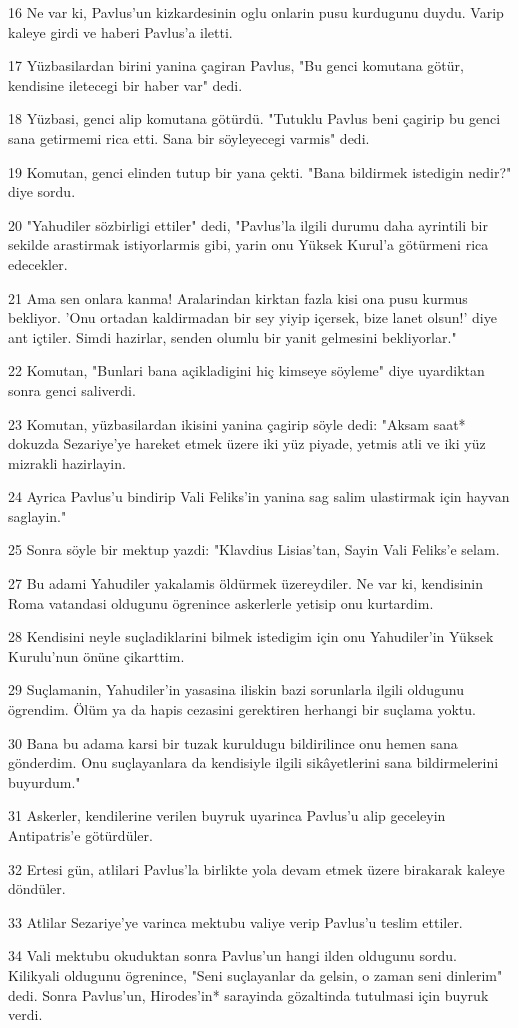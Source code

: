 \par 16 Ne var ki, Pavlus'un kizkardesinin oglu onlarin pusu kurdugunu duydu. Varip kaleye girdi ve haberi Pavlus'a iletti.
\par 17 Yüzbasilardan birini yanina çagiran Pavlus, "Bu genci komutana götür, kendisine iletecegi bir haber var" dedi.
\par 18 Yüzbasi, genci alip komutana götürdü. "Tutuklu Pavlus beni çagirip bu genci sana getirmemi rica etti. Sana bir söyleyecegi varmis" dedi.
\par 19 Komutan, genci elinden tutup bir yana çekti. "Bana bildirmek istedigin nedir?" diye sordu.
\par 20 "Yahudiler sözbirligi ettiler" dedi, "Pavlus'la ilgili durumu daha ayrintili bir sekilde arastirmak istiyorlarmis gibi, yarin onu Yüksek Kurul'a götürmeni rica edecekler.
\par 21 Ama sen onlara kanma! Aralarindan kirktan fazla kisi ona pusu kurmus bekliyor. 'Onu ortadan kaldirmadan bir sey yiyip içersek, bize lanet olsun!' diye ant içtiler. Simdi hazirlar, senden olumlu bir yanit gelmesini bekliyorlar."
\par 22 Komutan, "Bunlari bana açikladigini hiç kimseye söyleme" diye uyardiktan sonra genci saliverdi.
\par 23 Komutan, yüzbasilardan ikisini yanina çagirip söyle dedi: "Aksam saat* dokuzda Sezariye'ye hareket etmek üzere iki yüz piyade, yetmis atli ve iki yüz mizrakli hazirlayin.
\par 24 Ayrica Pavlus'u bindirip Vali Feliks'in yanina sag salim ulastirmak için hayvan saglayin."
\par 25 Sonra söyle bir mektup yazdi: "Klavdius Lisias'tan, Sayin Vali Feliks'e selam.
\par 27 Bu adami Yahudiler yakalamis öldürmek üzereydiler. Ne var ki, kendisinin Roma vatandasi oldugunu ögrenince askerlerle yetisip onu kurtardim.
\par 28 Kendisini neyle suçladiklarini bilmek istedigim için onu Yahudiler'in Yüksek Kurulu'nun önüne çikarttim.
\par 29 Suçlamanin, Yahudiler'in yasasina iliskin bazi sorunlarla ilgili oldugunu ögrendim. Ölüm ya da hapis cezasini gerektiren herhangi bir suçlama yoktu.
\par 30 Bana bu adama karsi bir tuzak kuruldugu bildirilince onu hemen sana gönderdim. Onu suçlayanlara da kendisiyle ilgili sikâyetlerini sana bildirmelerini buyurdum."
\par 31 Askerler, kendilerine verilen buyruk uyarinca Pavlus'u alip geceleyin Antipatris'e götürdüler.
\par 32 Ertesi gün, atlilari Pavlus'la birlikte yola devam etmek üzere birakarak kaleye döndüler.
\par 33 Atlilar Sezariye'ye varinca mektubu valiye verip Pavlus'u teslim ettiler.
\par 34 Vali mektubu okuduktan sonra Pavlus'un hangi ilden oldugunu sordu. Kilikyali oldugunu ögrenince, "Seni suçlayanlar da gelsin, o zaman seni dinlerim" dedi. Sonra Pavlus'un, Hirodes'in* sarayinda gözaltinda tutulmasi için buyruk verdi.

